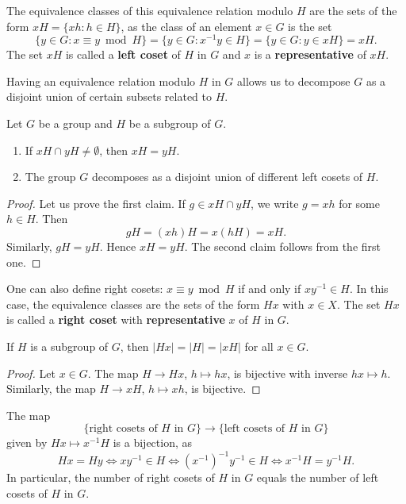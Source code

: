 The equivalence classes of this equivalence relation modulo $H$
are the sets of the form $xH=\{xh:h\in H\}$, as the class 
of an element $x\in G$ is the set 
\[
        \{y\in G:x\equiv y\bmod H\}=\{y\in G:x^{-1}y\in H\}=\{y\in G:y\in xH\}=xH.
\]
The set $xH$ is called 
a \textbf{left coset} of $H$ in $G$ and $x$ is 
a \textbf{representative} of $xH$.

Having an equivalence relation modulo $H$ in $G$ allows us to
decompose $G$ as a disjoint union of certain subsets related to $H$. 

\begin{proposition}
Let $G$ be a group and $H$ be a subgroup of $G$. 
\begin{enumerate}
\item If $xH\cap yH\ne\emptyset$, then $xH=yH$.
\item The group $G$ decomposes as a disjoint union 
of different left cosets of $H$.
\end{enumerate}
\end{proposition}

\begin{proof}
    Let us prove the first claim. If $g\in xH\cap yH$, we write 
    $g=xh$ for some $h\in H$. Then 
    \[
    gH=(xh)H=x(hH)=xH.
    \]
    Similarly, $gH=yH$. Hence $xH=yH$.
    The second claim follows from the first one. 
\end{proof}

One can also define right cosets: $x\equiv
y\bmod H$ if and only if $xy^{-1}\in H$. In this case, 
the equivalence classes are 
the sets of the form $Hx$ with $x\in X$. The set $Hx$ 
is called a \textbf{right coset}
with \textbf{representative} $x$ of $H$ in $G$. 

\begin{proposition}
    If $H$ is a subgroup of $G$, then  $|Hx|=|H|=|xH|$ for all $x\in G$.
\end{proposition}

\begin{proof}
    Let $x\in G$. The map $H\to Hx$, $h\mapsto hx$, is bijective 
    with inverse $hx\mapsto h$. Similarly, the map $H\to xH$,
    $h\mapsto xh$, is bijective.
\end{proof}

The map 
\[
        \{\text{right cosets of $H$ in $G$}\}\to\{\text{left cosets of $H$ in $G$}\}
\]
given by $Hx\mapsto x^{-1}H$ is a bijection, as 
\[
        Hx=Hy
        \Longleftrightarrow xy^{-1}\in H
        \Longleftrightarrow (x^{-1})^{-1}y^{-1}\in H
        \Longleftrightarrow x^{-1}H=y^{-1}H.
\]
In particular, the number of right cosets of $H$ in $G$
equals the number of left cosets of $H$ in $G$. 

